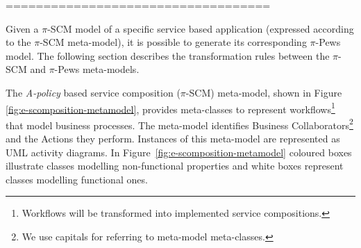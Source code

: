 ===================================



Given a $\pi$-SCM model of a specific service based application (expressed according to the $\pi$-SCM meta-model), it is possible to generate its corresponding $\pi$-{\sc Pews} model. 
The following section describes the transformation rules between the $\pi$-SCM and $\pi$-{\sc Pews} meta-models.







The {\em A-policy} based service composition ($\pi$-SCM) meta-model, shown in Figure \ref{fig:e-scomposition-metamodel},
provides meta-classes to represent workflows\footnote{Workflows will be transformed into implemented service compositions.} that model  business processes.
The meta-model identifies {\sc Business Collaborators}\footnote{We use {\sc capitals} for referring to meta-model meta-classes.} and the {\sc Actions} they perform. 
Instances of this meta-model are represented as UML activity diagrams. 
In Figure~\ref{fig:e-scomposition-metamodel}  coloured boxes illustrate classes  modelling  non-functional properties and 
 white boxes represent classes modelling functional ones. 

